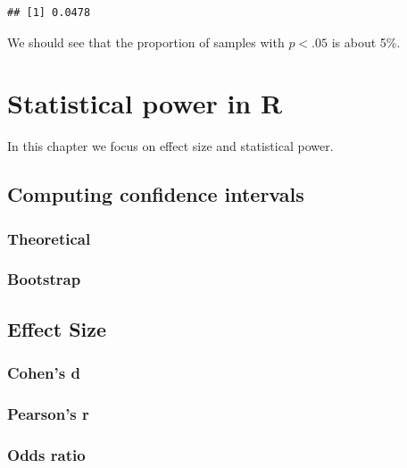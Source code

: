 \documentclass[12pt,]{book}
\begin{document}
\begin{verbatim}
## [1] 0.0478
\end{verbatim}

We should see that the proportion of samples with \(p < .05\) is about 5\%.

\hypertarget{statistical-power-in-r}{%
\chapter{Statistical power in R}\label{statistical-power-in-r}}

In this chapter we focus on effect size and statistical power.

\hypertarget{computing-confidence-intervals}{%
\section{Computing confidence intervals}\label{computing-confidence-intervals}}

\hypertarget{theoretical}{%
\subsection{Theoretical}\label{theoretical}}

\hypertarget{bootstrap}{%
\subsection{Bootstrap}\label{bootstrap}}

\hypertarget{effect-size}{%
\section{Effect Size}\label{effect-size}}

\hypertarget{cohens-d}{%
\subsection{Cohen's d}\label{cohens-d}}

\hypertarget{pearsons-r}{%
\subsection{Pearson's r}\label{pearsons-r}}

\hypertarget{odds-ratio}{%
\subsection{Odds ratio}\label{odds-ratio}}
\end{document}
